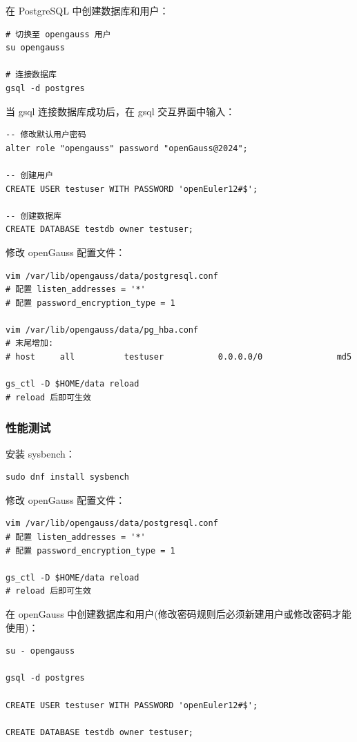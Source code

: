 \documentclass{article}
\begin{document}
在 PostgreSQL 中创建数据库和用户：

\begin{verbatim}
# 切换至 opengauss 用户
su opengauss

# 连接数据库
gsql -d postgres
\end{verbatim}

当 gsql 连接数据库成功后，在 gsql 交互界面中输入：

\begin{verbatim}
-- 修改默认用户密码
alter role "opengauss" password "openGauss@2024";

-- 创建用户
CREATE USER testuser WITH PASSWORD 'openEuler12#$';

-- 创建数据库
CREATE DATABASE testdb owner testuser;
\end{verbatim}


修改 openGauss 配置文件：

\begin{verbatim}
vim /var/lib/opengauss/data/postgresql.conf
# 配置 listen_addresses = '*'
# 配置 password_encryption_type = 1

vim /var/lib/opengauss/data/pg_hba.conf
# 末尾增加: 
# host     all          testuser           0.0.0.0/0               md5

gs_ctl -D $HOME/data reload
# reload 后即可生效
\end{verbatim}

\subsubsection{性能测试}

安装 sysbench：

\begin{verbatim}
sudo dnf install sysbench
\end{verbatim}

修改 openGauss 配置文件：

\begin{verbatim}
vim /var/lib/opengauss/data/postgresql.conf
# 配置 listen_addresses = '*'
# 配置 password_encryption_type = 1

gs_ctl -D $HOME/data reload
# reload 后即可生效
\end{verbatim}

在 openGauss 中创建数据库和用户(修改密码规则后必须新建用户或修改密码才能使用)：
\begin{verbatim}
su - opengauss

gsql -d postgres

CREATE USER testuser WITH PASSWORD 'openEuler12#$';

CREATE DATABASE testdb owner testuser;
\end{verbatim}
\end{document}
